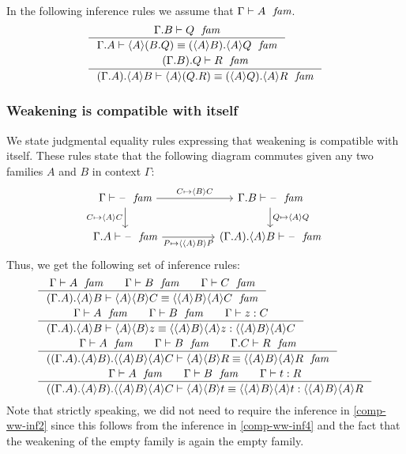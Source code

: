 In the following inference rules we assume that $\jfam{\Gamma}{A}$.
\begin{align}
& \inference
  {\jfam{\ctxext{\Gamma}{B}}{Q}}
  {\jfameq{\ctxext{\Gamma}{A}}{\ctxwk{A}{\ctxext{B}{Q}}}{\ctxext{\ctxwk{A}{B}}{\ctxwk{A}{Q}}}}\\
& \inference
  {\jfam{\ctxext{{\Gamma}{B}}{Q}}{R}}
  {\jfameq
    {\ctxext{{\Gamma}{A}}{\ctxwk{A}{B}}}
    {\ctxwk{A}{\ctxext{Q}{R}}}
    {\ctxext{\ctxwk{A}{Q}}{\ctxwk{A}{R}}}}
\end{align}

\subsubsection{Weakening is compatible with itself}\label{comp-ww}
We state judgmental equality rules expressing
that weakening is compatible with itself. These rules state that the following
diagram commutes given any two families $A$ and $B$ in context $\Gamma$:
\begin{equation*}
\begin{tikzcd}[column sep=huge]
\jfam{\Gamma}{\blank} \ar{r}{C\mapsto\ctxwk{B}{C}} \ar{d}[swap]{C\mapsto\ctxwk{A}{C}} & \jfam{\ctxext{\Gamma}{B}}{\blank} \ar{d}{Q\mapsto\ctxwk{A}{Q}}\\
\jfam{\ctxext{\Gamma}{A}}{\blank} \ar{r}[swap]{P\mapsto\ctxwk{{A}{B}}{P}} & \jfam{\ctxext{{\Gamma}{A}}{\ctxwk{A}{B}}}{\blank}
\end{tikzcd}
\end{equation*}
Thus, we get the following set of inference rules:
\begin{align}
& \inference{\jfam{\Gamma}{A}\qquad\jfam{\Gamma}{B}\qquad\jfam{\Gamma}{C}}
          {\jfameq{\ctxext{{\Gamma}{A}}{\ctxwk{A}{B}}}{\ctxwk{A}{{B}{C}}}
            {\ctxwk{{A}{B}}{{A}{C}}}}\\
& \inference{\jfam{\Gamma}{A}\qquad\jfam{\Gamma}{B}\qquad\jterm{\Gamma}{C}{z}}
          {\jtermeq{\ctxext{{\Gamma}{A}}{\ctxwk{A}{B}}}{\ctxwk{{A}{B}}{{A}{C}}}
            {\ctxwk{A}{{B}{z}}}
            {\ctxwk{{A}{B}}{{A}{z}}}}\label{comp-ww-inf2}\\
& \inference{\jfam{\Gamma}{A}\qquad\jfam{\Gamma}{B}\qquad\jfam{\ctxext{\Gamma}{C}}{R}}
          {\jfameq{\ctxext{{{\Gamma}{A}}{\ctxwk{A}{B}}}{\ctxwk{{A}{B}}{{A}{C}}}}
            {\ctxwk{A}{{B}{R}}}
            {\ctxwk{{A}{B}}{{A}{R}}}}\\
& \inference{\jfam{\Gamma}{A}\qquad\jfam{\Gamma}{B}\qquad\jterm{\Gamma}{R}{t}}
          {\jtermeq{\ctxext{{{\Gamma}{A}}{\ctxwk{A}{B}}}{\ctxwk{{A}{B}}{{A}{C}}}}
            {\ctxwk{{A}{B}}{{A}{R}}}{\ctxwk{A}{{B}{t}}}{\ctxwk{{A}{B}}{{A}{t}}}}
            \label{comp-ww-inf4}
\end{align}
Note that strictly speaking, we did not need to require the inference in
\autoref{comp-ww-inf2} since this follows from the inference in \autoref{comp-ww-inf4}
and the fact that the weakening of the empty family is again the empty family.


